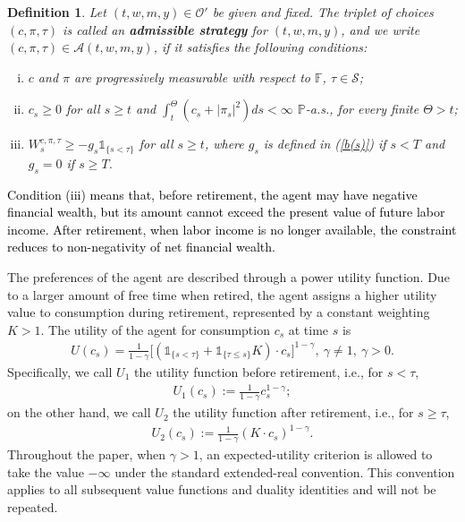 \documentclass[a4paper,11pt]{amsart}
\numberwithin{equation}{section}
\newtheorem{definition}{Definition}[section]
\newcommand{\blue}[1]{{\color{black}#1}}
\begin{document}
\begin{definition}\label{admissiblecontrol}
Let $(t,w,m,y) \in \mathcal{O}'$ be given and fixed. The triplet of choices $(c,\pi, \tau)$ is called an \textbf{admissible strategy} for $(t,w,m,y)$, and we write $(c,\pi, \tau) \in \mathcal{A}(t,w,m,y)$, if it satisfies the following conditions: 
\begin{enumerate}[(i)]
	\item  $c$ and $\pi$ are progressively measurable with respect to $\mathbb{F}$, $\tau \in \mathcal{S}$;
	\item $c_s \geq 0$ for all $s \geq t$ and {$\int_t^\Theta(c_s+|\pi_s|^2)ds <\infty$ $\mathbb{P}$-a.s., for every finite $\Theta>t$;} 
	\item $W^{c,\pi, \tau}_s \geq   -g_s\mathds{1}_{\{s< \tau\}}$ for all $s\geq t$, where $g_s$ is defined in (\ref{b(s)}) if $s <T$ and $g_s=0$ if $s \geq T$.
\end{enumerate}
\end{definition}
\textcolor{black}{Condition (iii) means that, before retirement, the agent may have negative financial wealth, but its amount cannot exceed the present value of future labor income. After retirement, when labor income is no longer available, the constraint reduces to non-negativity of net financial wealth. }



The preferences of the agent are described through a power utility function. Due to a larger amount of free time when retired, the agent assigns a higher utility value to consumption during retirement, represented by a constant weighting $K>1$. The utility of the agent for consumption $c_s$ at time $s$ is 
\begin{align*}
U(c_s)= \frac{1}{1-\gamma}\Big[(\mathds{1}_{\{s <\tau\}}+\mathds{1}_{\{\tau \leq s\}}K) \cdot c_s\Big]^{1-\gamma}, \ \gamma \neq 1, \ \gamma>0.
\end{align*}
 Specifically, we call $U_1$ the utility function before retirement, i.e., for $s<\tau$,
\begin{align*}
U_1(c_s):=\frac{1}{1-\gamma}c_s^{1-\gamma};
\end{align*}
on the other hand, we call $U_2$ the utility function after retirement, i.e., for $s\geq \tau$,
\begin{align*}
U_2(c_s):=\frac{1}{1-\gamma}(K \cdot c_s)^{1-\gamma}.
\end{align*}
\blue{Throughout the paper, when $\gamma>1$, an expected-utility criterion is allowed to take the value $-\infty$ under the standard extended-real convention. This convention applies to all subsequent value functions and duality identities and will not be repeated.}
\end{document}
